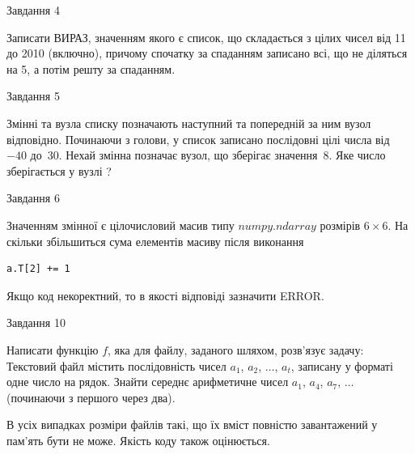 \documentclass[12pt, ukrainian]{article}
\begin{document}
{\begin{minipage}[t]{8.0cm}
\end{minipage}


               
{\begin{center}Завдання {4}\end{center}}
\vspace{-4mm}

Записати ВИРАЗ, значенням якого є список, що складається з цілих чисел від 11 до 2010 (включно), причому спочатку за спаданням записано всі, що не діляться на 5, а потім решту за спаданням.\par

\vspace{10mm}
               
{\begin{center}Завдання {5}\end{center}}
\vspace{-4mm}
Змінні  та  вузла списку позначають наступний та попередній за ним вузол відповідно. Починаючи з голови, у список записано послідовні цілі числа від~$-40$ до~$30$. Нехай змінна  позначає вузол, що зберігає значення~$8$.
Яке число зберігається у вузлі  ?\par

               
{\begin{center}Завдання {6}\end{center}}
\vspace{-4mm}
Значенням змінної  є цілочисловий масив типу $numpy.ndarray$ розмірів $6{\times}6$. На скільки збільшиться сума елементів масиву  після виконання
\begin{verbatim}
a.T[2] += 1
\end{verbatim}


Якщо код некоректний, то в якості відповіді зазначити ERROR.\par

               
{\begin{center}Завдання {10}\end{center}}
\vspace{-4mm}

Написати функцію $f$, яка для файлу, заданого шляхом, розв’язує задачу:\\ Текстовий файл містить послідовність чисел $a_1$, $a_2$, $\ldots$, $a_t$, записану у форматі одне число на рядок. Знайти середнє арифметичне чисел $a_1$, $a_4$, $a_7$, $\ldots$ (починаючи з першого через два).

В усіх випадках розміри файлів такі, що їх вміст повністю завантажений у пам'ять бути не може. Якість коду також оцінюється.



}
\end{document}
